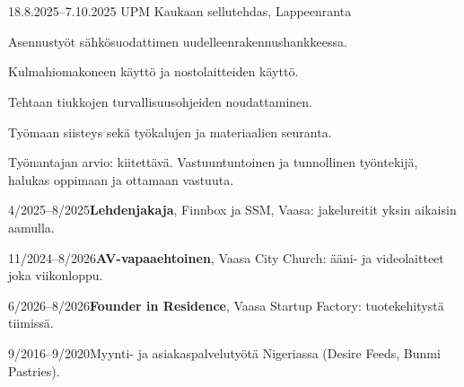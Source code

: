 \documentclass[a4paper,11pt]{article}
\begin{document}
\section{}
\begin{cventry}{18.8.2025--7.10.2025}{}
  UPM Kaukaan sellutehdas, Lappeenranta\par
  Asennustyöt sähkösuodattimen uudelleenrakennushankkeessa.\par
  Kulmahiomakoneen käyttö ja nostolaitteiden käyttö.\par
  Tehtaan tiukkojen turvallisuusohjeiden noudattaminen.\par
  Työmaan siisteys sekä työkalujen ja materiaalien seuranta.\par
  Työnantajan arvio: kiitettävä. Vastuuntuntoinen ja tunnollinen työntekijä, halukas oppimaan ja ottamaan vastuuta.
\end{cventry}
\begin{cventry}{4/2025--8/2025}{\textbf{Lehdenjakaja}, Finnbox ja SSM, Vaasa: jakelureitit yksin aikaisin aamulla.}
\end{cventry}
\begin{cventry}{11/2024--8/2026}{\textbf{AV-vapaaehtoinen}, Vaasa City Church: ääni- ja videolaitteet joka viikonloppu.}
\end{cventry}
\begin{cventry}{6/2026--8/2026}{\textbf{Founder in Residence}, Vaasa Startup Factory: tuotekehitystä tiimissä.}
\end{cventry}
\begin{cventry}{9/2016--9/2020}{Myynti- ja asiakaspalvelutyötä Nigeriassa (Desire Feeds, Bunmi Pastries).}
\end{cventry}

\section{}

\section{}
\end{document}

